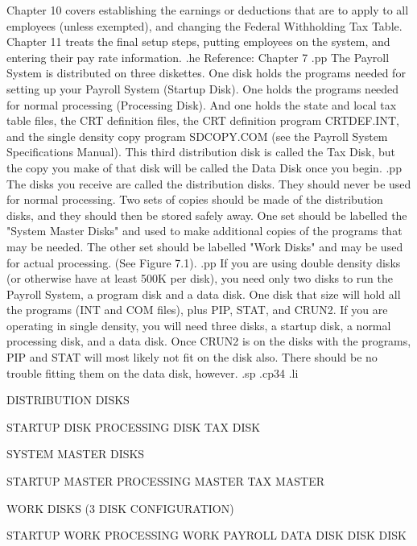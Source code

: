 Chapter 10 covers establishing the earnings or deductions that
are to apply to all employees (unless exempted), and
changing the Federal Withholding Tax Table.  Chapter 11 treats the
final setup steps, putting employees on the system, and entering their
pay rate information.
.he Reference: Chapter 7
.pp
The Payroll System is distributed on three diskettes.  One disk holds
the programs needed for setting up your Payroll System (Startup Disk).
One holds the
programs needed for normal processing (Processing Disk).
And one holds the state and local
tax table files, the CRT definition files, the CRT definition program
CRTDEF.INT, and the single density copy program SDCOPY.COM (see the
Payroll System Specifications Manual).	This third distribution disk
is called the Tax Disk, but the copy you make of that disk will be called
the Data Disk once you begin.
.pp
The disks you receive are called the distribution disks.  They should
never be used for normal processing.  Two sets of copies should be made
of the distribution disks, and they should then be stored safely away.
One set should be labelled the "System Master Disks" and used to make
additional copies of the programs that may be needed.  The other set
should be labelled "Work Disks" and may be used for actual processing.
(See Figure 7.1).
.pp
If you are using double density disks (or otherwise have at least
500K per disk), you need only two disks to run the Payroll System, a program
disk and a data disk.
One disk that size will hold all the programs (INT and COM files), plus
PIP, STAT, and CRUN2.  If you are operating in single density, you will
need three disks, a startup disk, a normal processing disk, and a data disk.
Once CRUN2 is on the disks with the programs, PIP and STAT will most likely
not fit on the disk also.  There should be no trouble fitting them on the
data disk, however.
.sp
.cp34
.li



						     DISTRIBUTION DISKS


      STARTUP DISK     PROCESSING DISK	   TAX DISK



						     SYSTEM MASTER DISKS



      STARTUP MASTER   PROCESSING MASTER  TAX MASTER



							  WORK DISKS
						     (3 DISK CONFIGURATION)


      STARTUP WORK   PROCESSING WORK	PAYROLL DATA
	 DISK		 DISK		    DISK


